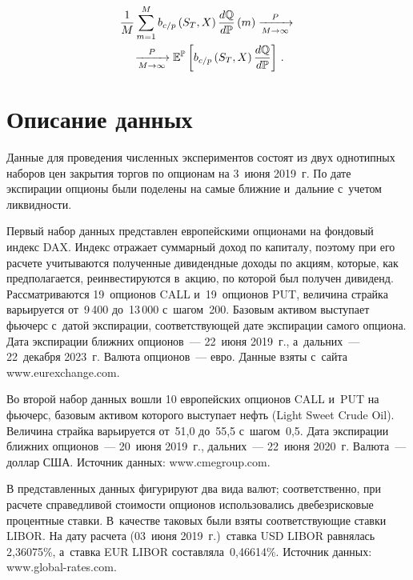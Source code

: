 \begin{multicols}{2}
\noindent
\begin{multline}
\displaystyle\frac{\displaystyle 1\mathstrut}{\displaystyle M\mathstrut}\sum\limits_{m=1}^M b_{c/p}\left( S_T, X\right) 
\displaystyle\frac{\displaystyle d\mathbb{Q}\mathstrut}{\displaystyle d\mathbb{P}\mathstrut}\,(m) 
\xrightarrow[M\to\infty]{P}{} \\
{}\xrightarrow[M\to\infty]{P}
\mathbb{E}^{\mathbb{P}} \left[ b_{c/p}\left( 
S_T,X\right)\displaystyle\frac{\displaystyle d\mathbb{Q}\mathstrut}{\displaystyle d\mathbb{P}\mathstrut}\right]\,.
\label{e7-dan}
\end{multline}

\vspace*{-9pt}

\section{Описание данных}

\vspace*{-3pt}

  Данные для проведения численных экспериментов состоят из двух 
однотипных наборов цен закрытия торгов по опционам на 3~июня 2019~г. По 
дате экспирации опционы были поделены на самые ближние и~дальние 
с~учетом ликвидности.
  
  Первый набор данных представлен европейскими опционами на фондовый 
индекс DAX. Индекс отражает суммарный доход по 
капиталу, поэтому при его расчете учитываются полученные дивидендные 
доходы по акциям, которые, как предполагается, реинвестируются в~акцию, 
по которой был получен дивиденд. Рас\-смат\-ри\-ва\-ют\-ся 19~опционов CALL 
и~19~опционов PUT, величина страйка варьируется от~9\,400 до~13\,000 
с~шагом~200. Базовым активом выступает фьючерс с~датой экспирации, 
соответствующей дате экспирации самого опциона. Дата экспирации ближних 
опционов~--- 22~июня 2019~г., а~дальних~--- 22~декабря 2023~г. Валюта 
опционов~--- евро. Данные взяты с~сайта {\sf www.eurexchange.com}.
  
  Во второй набор данных вошли 10 европейских опционов CALL и~PUT на 
фьючерс, базовым активом которого выступает нефть (Light Sweet Crude Oil). 
Величина страйка варьируется от~51,0 до~55,5 с~шагом~0,5. Дата экспирации 
ближних опционов~--- 20~июня 2019~г., дальних~--- 22~июня 2020~г. 
Валюта~--- доллар США. Источник данных: {\sf www.cmegroup.com}.
  
  В представленных данных фигурируют два вида валют; соответственно, при 
расчете справедливой стоимости опционов использовались две\linebreak безрисковые 
процентные ставки. В~качестве таковых были взяты соответствующие ставки 
LIBOR. На дату расчета (03~июня 2019~г.)\ ставка USD \mbox{LIBOR} равнялась 
2,36075\%, а~ставка EUR \mbox{LIBOR} со\-став\-ля\-ла~0,46614\%. Источник данных: 
{\sf www.global-rates.com}.


\end{multicols}
